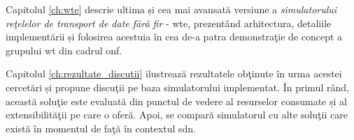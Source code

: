 Capitolul \ref{ch:wte} descrie ultima și cea mai avansată versiune a \textit{simulatorului reţelelor de transport de date fără fir} - \gls{wte}, prezentând arhitectura, detaliile implementării și folosirea acestuia în cea de-a patra demonstraţie de concept a grupului \gls{wt} din cadrul \gls{onf}.

Capitolul \ref{ch:rezultate_discutii} ilustrează rezultatele obţinute în urma acestei cercetări și propune discuţii pe baza simulatorului implementat. În primul rând, această soluţie este evaluată din punctul de vedere al resurselor consumate și al extensibilităţii pe care o oferă. Apoi, se compară simulatorul cu alte soluţii care există în momentul de faţă în contextul \gls{sdn}.